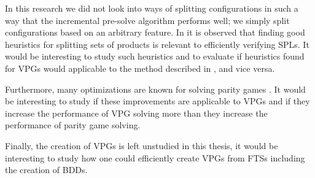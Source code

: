 In this research we did not look into ways of splitting configurations in such a way that the incremental pre-solve algorithm performs well; we simply split configurations based on an arbitrary feature. In \cite{FamBasedModelCheckingWithMCRL2} it is observed that finding good heuristics for splitting sets of products is relevant to efficiently verifying SPLs. It would be interesting to study such heuristics and to evaluate if heuristics found for VPGs would applicable to the method described in \cite{FamBasedModelCheckingWithMCRL2}, and vice versa.

Furthermore, many optimizations are known for solving parity games \cite{Oink,SolvingInPractice,dullweaksolitaire,Kant2013PracticalIT}. It would be interesting to study if these improvements are applicable to VPGs and if they increase the performance of VPG solving more than they increase the performance of parity game solving. 

Finally, the creation of VPGs is left unstudied in this thesis, it would be interesting to study how one could efficiently create VPGs from FTSs including the creation of BDDs.